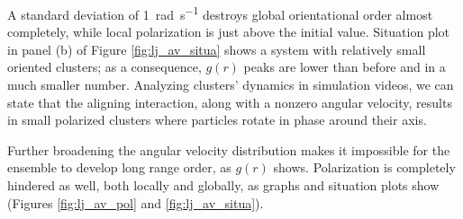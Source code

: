 \documentclass[../../master_thesis_np.tex]{subfiles}
\begin{document}
		A standard deviation of \SI{1}{\radian\per\second} destroys global orientational order almost completely, while local polarization is just above the initial value.
		Situation plot in panel (b) of Figure \ref{fig:lj_av_situa} shows a system with relatively small oriented clusters; as a consequence, $g(r)$ peaks are lower than before and in a much smaller number.
		Analyzing clusters' dynamics in simulation videos, we can state that the aligning interaction, along with a nonzero angular velocity, results in small polarized clusters where particles rotate in phase around their axis.
		
		Further broadening the angular velocity distribution makes it impossible for the ensemble to develop long range order, as $g(r)$ shows.
		Polarization is completely hindered as well, both locally and globally, as graphs and situation plots show (Figures \ref{fig:lj_av_pol} and \ref{fig:lj_av_situa}).
\end{document}
